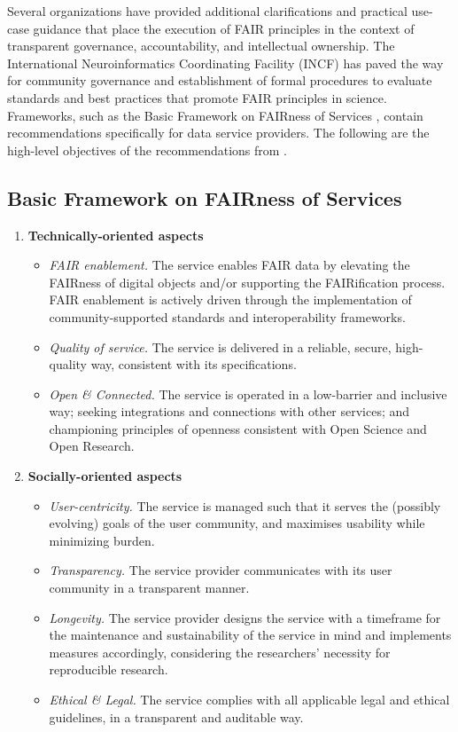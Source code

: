 \documentclass[conference]{IEEEtran}
\begin{document}
Several organizations have provided additional clarifications and practical use-case guidance that place the execution of FAIR principles in the context of transparent governance, accountability, and intellectual ownership. The International Neuroinformatics Coordinating Facility (INCF) has paved the way for community governance and establishment of formal procedures to evaluate standards and best practices that promote FAIR principles in science. Frameworks, such as the Basic Framework on FAIRness of Services \cite{BasicFrameworkv1} \cite{BasicFrameworkv3}, contain recommendations specifically for data service providers. The following are the high-level objectives of the recommendations from \cite{BasicFrameworkv3}.

\subsection{Basic Framework on FAIRness of Services}
\begin{enumerate}
   \item \textbf{Technically-oriented aspects} 
   \begin{itemize}
     \item \emph{FAIR enablement.} The service enables FAIR data by elevating the FAIRness of digital objects and/or supporting the FAIRification process. FAIR enablement is actively driven through the implementation of community-supported standards and interoperability frameworks.
     \item \emph{Quality of service.} The service is delivered in a reliable, secure, high-quality way, consistent with its specifications.
     \item \emph{Open \& Connected.} The service is operated in a low-barrier and inclusive way; seeking integrations and connections with other services; and championing principles of openness consistent with Open Science and Open Research.
   \end{itemize}
   
   \item \textbf{Socially-oriented aspects} 
   \begin{itemize}
     \item \emph{User-centricity.} The service is managed such that it serves the (possibly evolving) goals of the user community, and maximises usability while minimizing burden.
     \item \emph{Transparency.} The service provider communicates with its user community in a transparent manner.
     \item \emph{Longevity.} The service provider designs the service with a timeframe for the maintenance and sustainability of the service in mind and implements measures accordingly, considering the researchers’ necessity for reproducible research.
     \item \emph{Ethical \& Legal.} The service complies with all applicable legal and ethical guidelines, in a transparent and auditable way.
   \end{itemize}
   
\end{enumerate}
\end{document}
